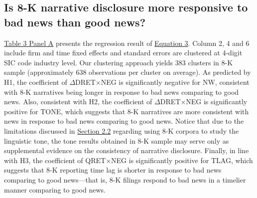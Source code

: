 \documentclass[a4paper]{article}
\begin{document}
\begin{spacing}{2}
\subsection{Is 8-K narrative disclosure more responsive to bad news than good news?}
\hyperref[T3PA]{Table 3 Panel A} presents the regression result of \hyperref[eq3]{Equation 3}. Column 2, 4 and 6 include firm and time fixed effects and standard errors are clustered at 4-digit SIC code industry level. Our clustering approach yields 383 clusters in 8-K sample (approximately 638 observations per cluster on average). As predicted by H1, the coefficient of $\Delta$DRET$\times$NEG is significantly negative for NW, consistent with 8-K narratives being longer in response to bad news comparing to good news. Also, consistent with H2, the coefficient of $\Delta$DRET$\times$NEG is significantly positive for TONE, which suggests that 8-K narratives are more consistent with news in response to bad news comparing to good news. Notice that due to the limitations discussed in \hyperref[sec2.2]{Section 2.2} regarding using 8-K corpora to study the linguistic tone, the tone results obtained in 8-K sample may serve only as supplemental evidence on the consistency of narrative disclosure. Finally, in line with H3, the coefficient of QRET$\times$NEG is significantly positive for TLAG, which suggests that 8-K reporting time lag is shorter in response to bad news comparing to good news---that is, 8-K filings respond to bad news in a timelier manner comparing to good news.


\end{spacing}
\end{document}
